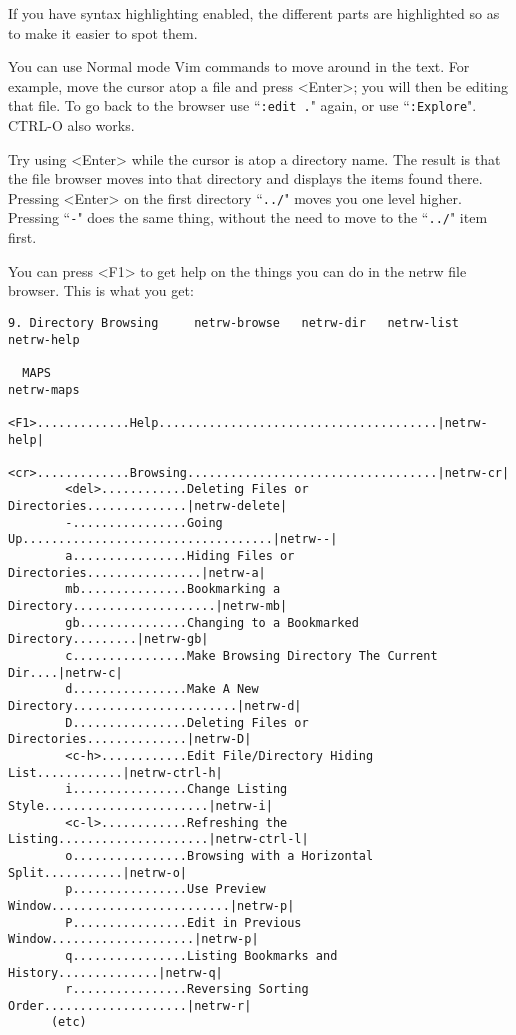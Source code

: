 If you have syntax highlighting enabled, the different parts are highlighted so as to make it easier to spot them.

You can use Normal mode Vim commands to move around in the text.
For example, move the cursor atop a file and press <Enter>; you will then be editing that file.
To go back to the browser use ``\texttt{:edit .}" again, or use ``\texttt{:Explore}".
CTRL-O also works.

Try using <Enter> while the cursor is atop a directory name.
The result is that the file browser moves into that directory and displays the items found there.
Pressing <Enter> on the first directory ``\texttt{../}" moves you one level higher.
Pressing ``\texttt{-}" does the same thing, without the need to move to the ``\texttt{../}" item first.

You can press <F1> to get help on the things you can do in the netrw file browser.
This is what you get:
\begin{Verbatim}[samepage=true]
  9. Directory Browsing     netrw-browse   netrw-dir   netrw-list   netrw-help

  MAPS                                                                  netrw-maps
        <F1>.............Help.......................................|netrw-help|
        <cr>.............Browsing...................................|netrw-cr|
        <del>............Deleting Files or Directories..............|netrw-delete|
        -................Going Up...................................|netrw--|
        a................Hiding Files or Directories................|netrw-a|
        mb...............Bookmarking a Directory....................|netrw-mb|
        gb...............Changing to a Bookmarked Directory.........|netrw-gb|
        c................Make Browsing Directory The Current Dir....|netrw-c|
        d................Make A New Directory.......................|netrw-d|
        D................Deleting Files or Directories..............|netrw-D|
        <c-h>............Edit File/Directory Hiding List............|netrw-ctrl-h|
        i................Change Listing Style.......................|netrw-i|
        <c-l>............Refreshing the Listing.....................|netrw-ctrl-l|
        o................Browsing with a Horizontal Split...........|netrw-o|
        p................Use Preview Window.........................|netrw-p|
        P................Edit in Previous Window....................|netrw-p|
        q................Listing Bookmarks and History..............|netrw-q|
        r................Reversing Sorting Order....................|netrw-r|
      (etc)
\end{Verbatim}

